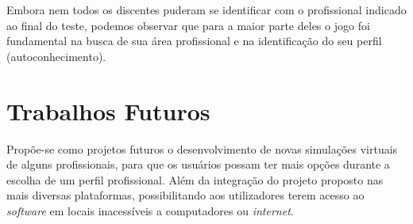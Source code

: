 \documentclass[
	12pt,				%
    oneside,			%
	a4paper,			%
	english,			%
	french,				%
	spanish,			%
	brazil,				%
	]{abntex2}
\begin{document}
Embora nem todos os discentes puderam se identificar com o profissional indicado ao final do teste, podemos observar que para a maior parte deles o jogo foi fundamental na busca de sua área profissional e na identificação do seu perfil (autoconhecimento). 

\section{Trabalhos Futuros}

Propõe-se como projetos futuros o desenvolvimento de novas simulações virtuais de alguns profissionais, para que os usuários possam ter mais opções durante a escolha de um perfil profissional. Além da integração do projeto proposto nas mais diversas plataformas, possibilitando aos utilizadores terem acesso ao \textit{software} em locais inacessíveis a computadores ou \textit{internet}. 


\postextual



%
%

\end{document}
